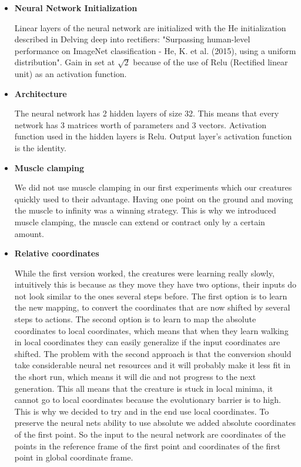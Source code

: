         \begin{itemize}
            \item \textbf{Neural Network Initialization}

            Linear layers of the neural network are initialized with the He initialization described in Delving deep into rectifiers: "Surpassing human-level performance on ImageNet classification - He, K. et al. (2015), using a uniform distribution". Gain in set at \(\sqrt{2}\) because of the use of Relu (Rectified linear unit) as an activation function. 
            

            \item \textbf{Architecture}

            The neural network has 2 hidden layers of size 32. This means that every network has 3 matrices worth of parameters and 3 vectors. Activation function used in the hidden layers is Relu. Output layer's activation function is the identity.    
            

            \item \textbf{Muscle clamping}

            We did not use muscle clamping in our first experiments which our creatures quickly used to their advantage. Having one point on the ground and moving the muscle to infinity was a winning strategy. This is why we introduced muscle clamping, the muscle can extend or contract only by a certain amount.

            \item \textbf{Relative coordinates}

            While the first version worked, the creatures were learning really slowly, intuitively this is because as they move they have two options, their inputs do not look similar to the ones several steps before. The first option is to learn the new mapping, to convert the coordinates that are now shifted by several steps to actions. The second option is to learn to map the absolute coordinates to local coordinates, which means that when they learn walking in local coordinates they can easily generalize if the input coordinates are shifted. The problem with the second approach is that the conversion should take considerable neural net resources and it will probably make it less fit in the short run, which means it will die and not progress to the next generation. This all means that the creature is stuck in local minima, it cannot go to local coordinates because the evolutionary barrier is to high. This is why we decided to try and in the end use local coordinates. To preserve the neural nets ability to use absolute we added absolute coordinates of the first point. So the input to the neural network are coordinates of the points in the reference frame of the first point and coordinates of the first point in global coordinate frame.


\end{itemize}
